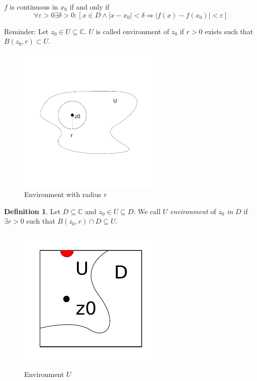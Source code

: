 \documentclass[a4paper,landscape,twocolumn]{article}
\theoremstyle{definition}
\newtheorem{defi}{Definition}
\newcommand\abs[1]{\left|#1\right|}
\begin{document}
$f$ is continuous in $x_0$ if and only if
\[
  \forall \varepsilon > 0 \exists \delta > 0:
  [x \in D \land \abs{x - x_0} < \delta \Rightarrow \abs{f(x) - f(x_0)} < \varepsilon]
\]

Reminder:
Let $z_0 \in U \subseteq \mathbb C$.
$U$ is called environment of $z_0$ if $r > 0$ exists such that $B(z_0, r) \subset U$.

\begin{figure}[!h]
  \begin{center}
    \includegraphics[width=200pt]{img/environment.pdf}
    \caption{Environment with radius $r$}
  \end{center}
\end{figure}

\begin{defi}
  Let $D \subseteq \mathbb C$ and $z_0 \in U \subseteq D$.
  We call $U$ \emph{environment} of $z_0$ \emph{in} $D$ if $\exists r > 0$
  such that $B(z_0, r) \cap D \subseteq U$.
\end{defi}

\begin{figure}[!h]
  \begin{center}
    \includegraphics[width=200pt]{img/environment_D_and_U.pdf}
    \caption{Environment $U$}
  \end{center}
\end{figure}
\end{document}
